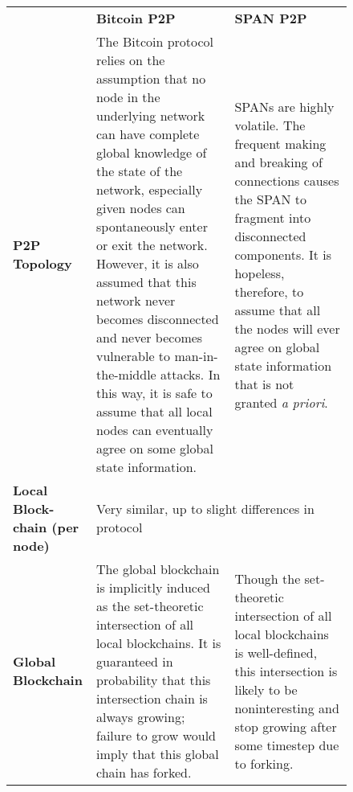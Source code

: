 \begin{figure*}
	\centering
	\begin{tabular}{|p{3cm}||p{6.7cm}|p{6.7cm}|}
		\hline
		& \textbf{Bitcoin P2P} & \textbf{SPAN P2P} \\
		\hhline{|-||-|-|}

		\textbf{P2P Topology} &
			The Bitcoin protocol relies on the assumption that
			no node in the underlying network can have
			complete global knowledge of the state of the
			network, especially given nodes can spontaneously enter or
			exit the network. However, it is also assumed that
			this network never becomes disconnected and never
			becomes vulnerable to man-in-the-middle attacks.
			In this way, it is safe to assume that all local
			nodes can eventually agree on some global state
			information.
			&
			SPANs are highly volatile. The frequent making and
			breaking of connections causes the SPAN
			to fragment into disconnected components. It is hopeless,
			therefore, to assume that all the nodes will ever
			agree on global state information that is not
			granted \textit{a priori}.
			\\
		\hline

		\raggedright
		\textbf{Local Block-\\chain (per node)} & %
			\multicolumn{2}{|l|}{
				Very similar, up to slight differences in protocol
			}
			\\
		\hline

		\textbf{Global Blockchain} &
			The global blockchain is implicitly induced as the
			set-theoretic intersection of all local blockchains.
			It is guaranteed in probability that this intersection
			chain is always growing; failure to grow would imply
			that this global chain has forked.
			&
			Though the set-theoretic intersection of all local
			blockchains is well-defined, this intersection is
			likely to be noninteresting and stop growing after some
			timestep due to forking.
			\\
		\hline


\end{tabular}
\end{figure*}
